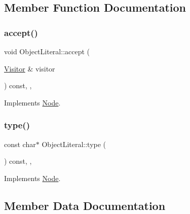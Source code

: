 \subsection{Member Function Documentation}
\mbox{\label{struct_object_literal_ac107a4d1da4363ece10d6823adbbf927}} 
\subsubsection{\texorpdfstring{accept()}{accept()}}
{\footnotesize\ttfamily void Object\+Literal\+::accept (\begin{DoxyParamCaption}\item[{\hyperlink{struct_visitor}{Visitor} \&}]{visitor }\end{DoxyParamCaption}) const\hspace{0.3cm}{\ttfamily [inline]}, {\ttfamily [override]}, {\ttfamily [virtual]}}



Implements \hyperlink{struct_node_a10bd7af968140bbf5fa461298a969c71}{Node}.

\mbox{\label{struct_object_literal_a241e2c71f0bca32666d18bff4531c758}} 
\subsubsection{\texorpdfstring{type()}{type()}}
{\footnotesize\ttfamily const char$\ast$ Object\+Literal\+::type (\begin{DoxyParamCaption}{ }\end{DoxyParamCaption}) const\hspace{0.3cm}{\ttfamily [inline]}, {\ttfamily [override]}, {\ttfamily [virtual]}}



Implements \hyperlink{struct_node_a82f29420d0a38efcc370352528e94e9b}{Node}.



\subsection{Member Data Documentation}
\mbox{\label{struct_object_literal_acac683107c99000db5fd4c287235e919}} 
